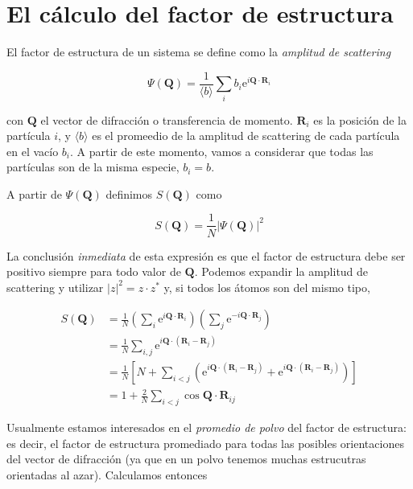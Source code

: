 \section{El cálculo del factor de estructura}

El factor de estructura de un sistema se define como la \emph{amplitud de scattering}~\cite{egami_underneath_2003}

\begin{equation}
  \Psi(\mathbf{Q}) = \frac{1}{\langle b\rangle} \sum_i b_i
  \text{e}^{i\mathbf{Q}\cdot\mathbf{R}_i}
  \label{eq:scat_amp}
\end{equation}

con $\mathbf{Q}$ el vector de difracción o transferencia de momento.
$\mathbf{R}_i$ es la posición de la partícula $i$, y $\langle b\rangle$ es el promeedio de la amplitud de scattering de cada partícula en el vacío $b_i$.
A partir de este momento, vamos a considerar que todas las partículas son de la misma especie, $b_i = b$.

A partir de $\Psi(\mathbf{Q})$ definimos $S(\mathbf{Q})$ como

\begin{equation*}
  S(\mathbf{Q}) = \frac{1}{N} |\Psi(\mathbf{Q})|^2
\end{equation*}

La conclusión \emph{inmediata} de esta expresión es que el factor de estructura debe ser positivo siempre para todo valor de $\mathbf{Q}$.
Podemos expandir la amplitud de scattering y utilizar $|z|^2 = z\cdot z^*$  y, si todos los átomos son del mismo tipo,


\begin{align*}
  S(\mathbf{Q}) &= \frac{1}{N} \left( \sum_i \text{e}^{i\mathbf{Q}\cdot\mathbf{R}_i} \right)
  \left( \sum_j \text{e}^{-i\mathbf{Q}\cdot\mathbf{R}_j} \right)\\
  &= \frac{1}{N} \sum_{i, j} \text{e}^{i\mathbf{Q}\cdot(\mathbf{R}_i-\mathbf{R}_j)}\\
  &= \frac{1}{N} \left[N + \sum_{i < j}
    \left(\text{e}^{i\mathbf{Q}\cdot(\mathbf{R}_i-\mathbf{R}_j)} +
      \text{e}^{i\mathbf{Q}\cdot(\mathbf{R}_i-\mathbf{R}_j)}\right)\right]\\
  &= 1 + \frac{2}{N}\sum_{i < j}\cos{\mathbf{Q}\cdot\mathbf{R}_{ij}}
\end{align*}

Usualmente estamos interesados en el \emph{promedio de polvo} del factor de estructura: es decir, el factor de estructura promediado para todas las posibles orientaciones del vector de difracción (ya que en un polvo tenemos muchas estrucutras orientadas al azar).
Calculamos entonces

